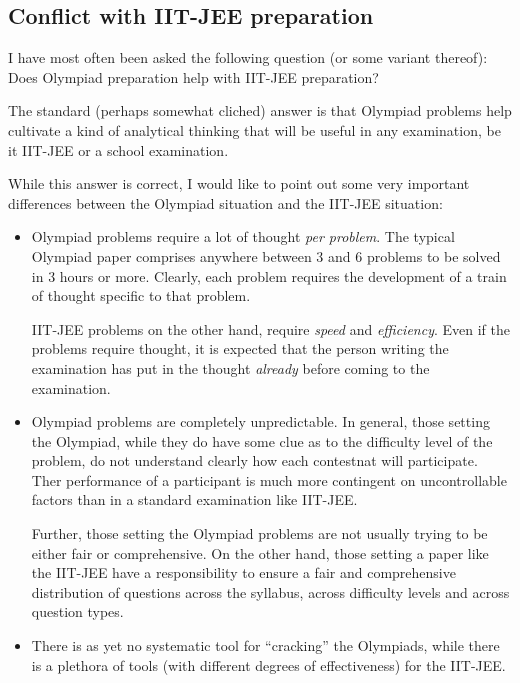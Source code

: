 \documentclass[a4paper]{amsart}
\begin{document}
\subsection{Conflict with IIT-JEE preparation}

I have most often been asked the following question (or some variant
thereof): Does Olympiad preparation help with IIT-JEE preparation?

The standard (perhaps somewhat cliched) answer is that Olympiad
problems help cultivate a kind of analytical thinking that will be
useful in any examination, be it IIT-JEE or a school examination.

While this answer is correct, I would like to point out some very
important differences between the Olympiad situation and the IIT-JEE
situation:

\begin{itemize}

\item Olympiad problems require a lot of thought {\em per problem}.
  The typical Olympiad paper comprises anywhere between 3 and 6
  problems to be solved in 3 hours or more. Clearly, each problem
  requires the development of a train of thought specific to that problem.

  IIT-JEE problems on the other hand, require {\em speed} and {\em
    efficiency}.  Even if the problems require thought, it is expected
  that the person writing the examination has put in the thought {\em already}
  before coming to the examination.

\item Olympiad problems are completely unpredictable. In general,
  those setting the Olympiad, while they do have some clue as to the
  difficulty level of the problem, do not understand clearly how each
  contestnat will participate. Ther performance of a participant is
  much more contingent on uncontrollable factors than in a standard examination
  like IIT-JEE.

  Further, those setting the Olympiad problems are not usually trying
  to be either fair or comprehensive. On the other hand, those setting
  a paper like the IIT-JEE have a responsibility to ensure a fair and
  comprehensive distribution of questions across the syllabus, across
  difficulty levels and across question types.

\item There is as yet no systematic tool for ``cracking'' the
  Olympiads, while there is a plethora of tools (with different
  degrees of effectiveness) for the IIT-JEE.

\end{itemize}
\end{document}
